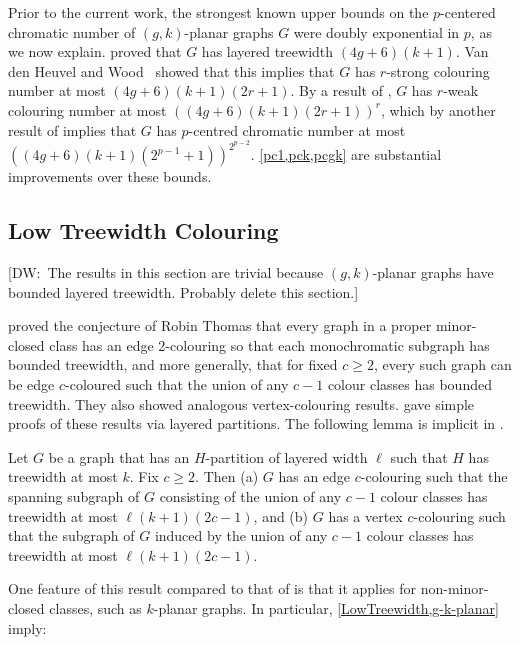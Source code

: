 \documentclass{patmorin}
\newcommand{\note}[2]{{\color{red}[#1:~#2]}}
\renewcommand{\geq}{\geqslant}
\begin{document}
Prior to the current work, the strongest known upper bounds on the $p$-centered chromatic number of $(g,k)$-planar graphs $G$ were doubly exponential in $p$, as we now explain. 
\citet{dujmovic.eppstein.ea:structure} proved that $G$ has layered treewidth $(4g+6)(k+1)$. 
Van den Heuvel and Wood~\citep{vdHW17} showed that this implies that $G$  has $r$-strong colouring number at most $(4g + 6)(k + 1)(2r + 1)$. By a result of \citet{zhu:colouring}, $G$ has $r$-weak colouring number at most $( (4g + 6)(k + 1)(2r + 1) )^r$, which by another result of  \citet{zhu:colouring} implies that $G$ has  $p$-centred chromatic number at most $( (4g+6)(k+1)(2^{p-1} + 1) )^{2^{p-2}}$. 
\cref{pc1,pck,pcgk} are substantial improvements over these bounds. 

\subsection{Low Treewidth Colouring}

\note{DW}{The results in this section are trivial because $(g,k)$-planar graphs have bounded layered treewidth. Probably delete this section.}

\citet{DDOSRSV04} proved the conjecture of Robin Thomas that every graph in a proper minor-closed class has an edge 2-colouring so that each monochromatic subgraph has bounded treewidth, and more generally, that for fixed $c\geq 2$, every such graph can be edge $c$-coloured such that the union of any $c-1$ colour classes has bounded treewidth. They also showed analogous vertex-colouring results. \citet{dujmovic.joret.ea:planar} gave simple proofs of these results via layered partitions. The following lemma is implicit in \citep{dujmovic.joret.ea:planar}.

\begin{lem}
\label{LowTreewidth}
Let $G$ be a graph that has an $H$-partition of layered width $\ell$ such that $H$ has treewidth at most $k$. Fix $c\geq 2$. Then (a) $G$ has an edge $c$-colouring such that the spanning subgraph of $G$ consisting of the union of any $c-1$ colour classes has treewidth at most $\ell(k+1)(2c-1)$, and (b) $G$ has a vertex $c$-colouring such that the subgraph of $G$ induced by the union of any $c-1$ colour classes has treewidth at most $\ell(k+1)(2c-1)$.
\end{lem}

One feature of this result compared to that of \citet{DDOSRSV04}  is that it applies for non-minor-closed classes, such as $k$-planar graphs. In particular, \cref{LowTreewidth,g-k-planar} imply:
\end{document}

